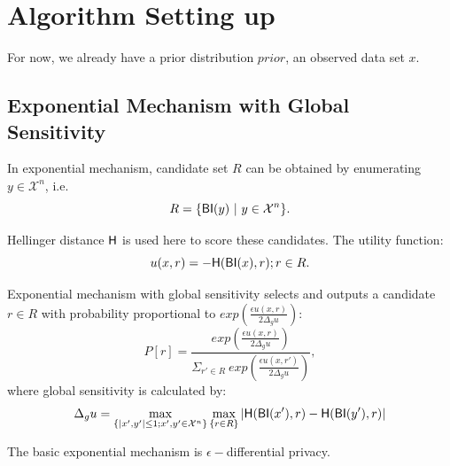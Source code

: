 \section{Algorithm Setting up}
\label{sec_setup}
For now, we already have a prior distribution $prior$, an observed data set $x$.

\subsection{Exponential Mechanism with Global Sensitivity}
\label{subsec_emgs}


In exponential mechanism, candidate set $R$ can be obtained by enumerating $y \in \mathcal{X}^n$, i.e.
\begin{equation*}
R = \{\mathsf{BI}(y)\ |\ y \in \mathcal{X}^n\}.
\end{equation*}

Hellinger distance $\mathsf{H}$ is used here to score these candidates. The utility function:
\begin{equation}
\label{equ_utility}
u(x,r) = -\mathsf{H}(\mathsf{BI}(x), r); r \in R.
\end{equation}

Exponential mechanism with global sensitivity selects and outputs a candidate $r \in R$ with probability proportional to $exp(\frac{\epsilon u(x,r)}{2 \Delta_{g}u})$:
\begin{equation*}
P[r] = \frac
{exp(\frac{\epsilon u(x,r)}{2 \Delta_{g}u})}
{\Sigma_{r' \in R}\ exp(\frac{\epsilon u(x,r')}{2 \Delta_{g}u})},
\end{equation*}
where global sensitivity is calculated by:
\begin{equation*}
\Delta_{g}u = 
\max_{\{|x',y'| \leq 1;x',y'\in \mathcal{X}^n\}}\max_{\{r\in R\}}
|\mathsf{H}(\mathsf{BI}(x'), r) - \mathsf{H}(\mathsf{BI}(y'), r)|
\end{equation*}

The basic exponential mechanism is $\epsilon -$differential privacy\cite{dwork2014algorithmic}.


